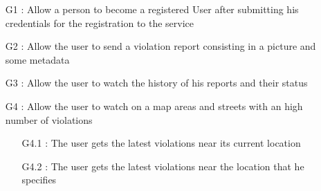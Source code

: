 \begin{itemize}
  \item [G1]: Allow a person to become a registered User after submitting his credentials for the registration to the service
  \item [G2]: Allow the user to send a violation report consisting in a picture and some metadata
  \item [G3]: Allow the user to watch the history of his reports and their status
  \item [G4]: Allow the user to watch on a map areas and streets with an high number of violations
  \begin{itemize}
    \item [G4.1]: The user gets the latest violations near its current location 
    \item [G4.2]: The user gets the latest violations near the location that he specifies
  \end{itemize}  
  
\end{itemize}
